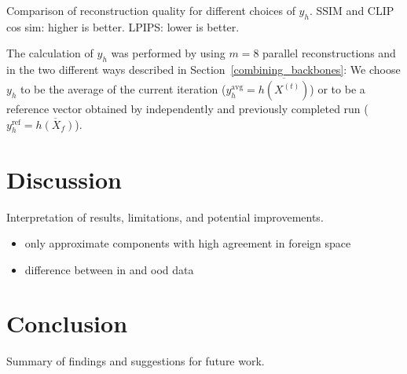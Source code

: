 \documentclass[10pt,twocolumn]{article}
\begin{document}
\begin{table}[ht]
    \centering
        
        \caption{
            Comparison of reconstruction quality for different choices of $y_h$.
            SSIM and CLIP cos sim: higher is better.
            LPIPS: lower is better.
        }
        \label{tab:results_comparison}
\end{table}

The calculation of $y_h$ was performed by using $m=8$ parallel reconstructions and in the two different ways described in Section~\ref{combining_backbones}:
We choose $y_h$ to be the average of the current iteration ($y_h^\text{avg}=\overline{h(X^{(t)})}$) or to be a reference vector obtained by independently and previously completed run ($y_h^\text{ref}=\overline{h(X_f)}$).

\section{Discussion}
Interpretation of results, limitations, and potential improvements.
\begin{itemize}
    \item only approximate components with high agreement in foreign space
    \item difference between in and ood data
\end{itemize}

\section{Conclusion}
Summary of findings and suggestions for future work.



\end{document}
